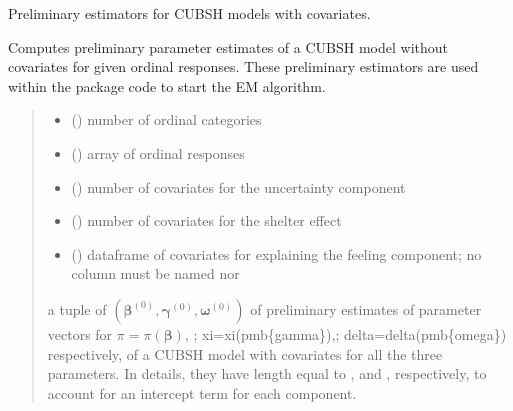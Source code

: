 \documentclass[letterpaper,10pt,english]{sphinxmanual}
\begin{document}
\begin{fulllineitems}
\label{\detokenize{cubmods:cubmods.cubsh_ywx.init_theta}}
\pysigstartsignatures
{}
\pysigstopsignatures
\sphinxAtStartPar
Preliminary estimators for CUBSH models with covariates.

\sphinxAtStartPar
Computes preliminary parameter estimates of a CUBSH model without covariates for given ordinal
responses. These preliminary estimators are used within the package code to start the E\sphinxhyphen{}M algorithm.
\begin{quote}\begin{description}
\begin{itemize}
\item {} 
\sphinxAtStartPar
{} () \textendash{} number of ordinal categories

\item {} 
\sphinxAtStartPar
{} () \textendash{} array of ordinal responses

\item {} 
\sphinxAtStartPar
{} () \textendash{} number of covariates for the uncertainty component

\item {} 
\sphinxAtStartPar
{} () \textendash{} number of covariates for the shelter effect

\item {} 
\sphinxAtStartPar
{} () \textendash{} dataframe of covariates for explaining the feeling component;
no column must be named  nor 

\end{itemize}

\sphinxAtStartPar
a tuple of \((\pmb \beta^{(0)}, \pmb \gamma^{(0)}, \pmb \omega^{(0)})\) of preliminary estimates of parameter vectors for 
\(\pi = \pi(\pmb{\beta})\), ; xi=xi(pmb\{gamma\}),; delta=delta(pmb\{omega\})\textasciigrave{} respectively, of a CUBSH model with covariates for all the three
parameters. In details, they have length equal to ,  and
, respectively, to account for an intercept term for each component.


\end{description}
\end{quote}
\end{fulllineitems}
\end{document}
